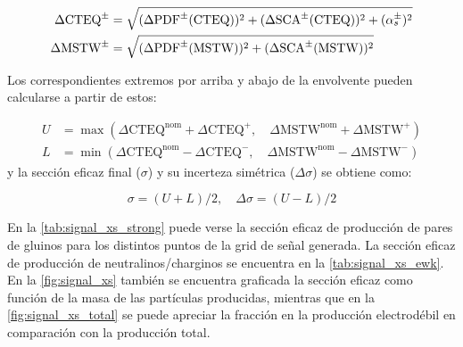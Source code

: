 \begin{align}
  \Delta\mathrm{CTEQ}^{\pm} &= \sqrt{(\Delta\mathrm{PDF}^{\pm}(\mathrm{CTEQ}))^2 + (\Delta\mathrm{SCA}^{\pm}(\mathrm{CTEQ}))^2 + (\alpha_s^{\pm})^2} \\
  \Delta\mathrm{MSTW}^{\pm} &= \sqrt{(\Delta\mathrm{PDF}^{\pm}(\mathrm{MSTW}))^2 + (\Delta\mathrm{SCA}^{\pm}(\mathrm{MSTW}))^2}
\end{align}

Los correspondientes extremos por arriba y abajo de la envolvente pueden calcularse a partir de estos:

\begin{align}
  U &= \max(\Delta\mathrm{CTEQ}^\mathrm{nom} + \Delta\mathrm{CTEQ}^{+},\quad \Delta\mathrm{MSTW}^\mathrm{nom} + \Delta\mathrm{MSTW}^{+}) \\
  L &= \min(\Delta\mathrm{CTEQ}^\mathrm{nom} - \Delta\mathrm{CTEQ}^{-},\quad \Delta\mathrm{MSTW}^\mathrm{nom} - \Delta\mathrm{MSTW}^{-})
\end{align}
%
y la sección eficaz final ($\sigma$) y su incerteza simétrica ($\Delta\sigma$) se obtiene como:

\begin{equation}
  \sigma = (U+L)/2,\quad \Delta\sigma = (U-L)/2
\end{equation}


En la \cref{tab:signal_xs_strong} puede verse la sección eficaz de producción de
pares de gluinos para los distintos puntos de la grid de señal generada. La
sección eficaz de producción de neutralinos/charginos se encuentra en la
\cref{tab:signal_xs_ewk}. En la \cref{fig:signal_xs} también se encuentra
graficada la sección eficaz como función de la masa de las partículas
producidas, mientras que en la \cref{fig:signal_xs_total} se puede apreciar la
fracción en la producción electrodébil en comparación con la producción total.

